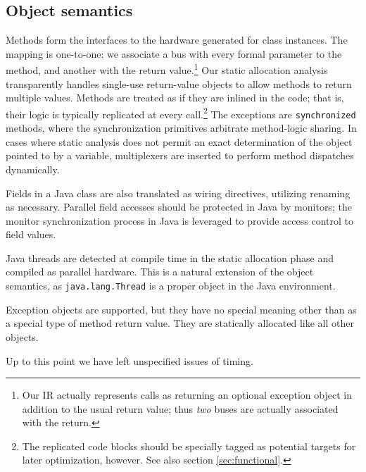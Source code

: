\documentclass[11pt,notitlepage,twocolumn]{article}
\begin{document}
\subsection{Object semantics}
Methods form the interfaces to the hardware generated for class
instances.  The mapping is one-to-one: we associate a bus with
every formal parameter to the method, and another with the return
value.\footnote{Our IR actually represents calls as returning an
optional exception object in addition to the usual return value; thus
\textit{two} buses are actually associated with the return.}
Our static allocation analysis transparently handles
single-use return-value objects to allow methods to return multiple
values.  Methods are treated as if they are inlined in the code; that
is, their logic is typically replicated at every call.\footnote{The
replicated code blocks should be specially tagged as potential targets
for later optimization, however.  See also section
\ref{sec:functional}.}  The exceptions are
\texttt{synchronized} methods, where the synchronization primitives
arbitrate method-logic sharing.  In cases where static analysis does
not permit an exact determination of the object pointed to by
a variable, multiplexers are inserted to perform method dispatches
dynamically.

Fields in a Java class are also translated as wiring directives,
utilizing renaming as necessary.  Parallel field accesses should be
protected in Java by monitors; the monitor synchronization process in
Java is leveraged to provide access control to field values.

Java threads are detected at compile time in the static allocation
phase and compiled as parallel hardware.  This is a natural extension
of the object semantics, as \texttt{java.lang.Thread} is a proper 
object in the Java environment.

Exception objects are supported, but they have no special meaning other than
as a special type of method return value.  They are statically allocated
like all other objects.

Up to this point we have left unspecified issues of timing.
\end{document}
